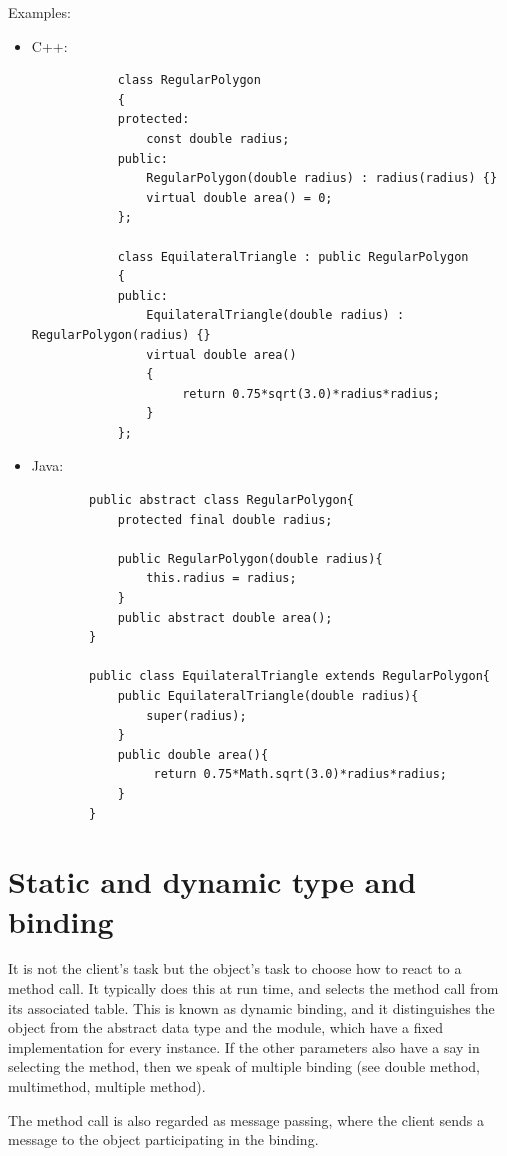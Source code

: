\documentclass[margin=0px]{article}
\begin{document}
\noindent Examples:
\begin{itemize}
    \item	C++:
          \begin{verbatim}
            class RegularPolygon
            {
            protected:
                const double radius;
            public:
                RegularPolygon(double radius) : radius(radius) {}
                virtual double area() = 0;
            };

            class EquilateralTriangle : public RegularPolygon
            {
            public:
                EquilateralTriangle(double radius) : RegularPolygon(radius) {}
                virtual double area()
                {
                     return 0.75*sqrt(3.0)*radius*radius;
                }
            };
        \end{verbatim}

    \item	Java:
          \begin{verbatim}
        public abstract class RegularPolygon{
            protected final double radius;

            public RegularPolygon(double radius){
                this.radius = radius;
            }
            public abstract double area();
        }

        public class EquilateralTriangle extends RegularPolygon{
            public EquilateralTriangle(double radius){
                super(radius);
            }
            public double area(){
                 return 0.75*Math.sqrt(3.0)*radius*radius;
            }
        }

        \end{verbatim}
\end{itemize}

\section{Static and dynamic type and binding}
It is not the client's task but the object's task to choose how to react to a method call. It typically does this at run time, and selects the method call from its associated table. This is known as dynamic binding, and it distinguishes the object from the abstract data type and the module, which have a fixed implementation for every instance. If the other parameters also have a say in selecting the method, then we speak of multiple binding (see double method, multimethod, multiple method).

The method call is also regarded as message passing, where the client sends a message to the object participating in the binding.
\end{document}
